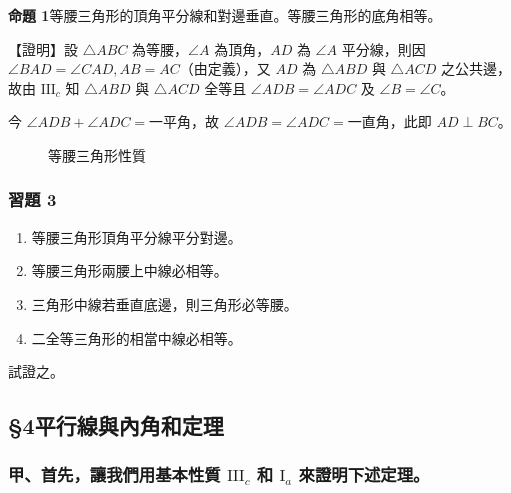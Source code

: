 \noindent\textbf{命題 1}\quad 等腰三角形的頂角平分線和對邊垂直。等腰三角形的底角相等。

\noindent【證明】\quad 設 $\triangle ABC$ 為等腰，$\angle A$ 為頂角，$AD$ 為 $\angle A$ 平分線，則因 $\angle BAD = \angle CAD, AB = AC$（由定義），又 $AD$ 為 $\triangle ABD$ 與 $\triangle ACD$ 之公共邊，故由 $\mathrm{III}_c$ 知 $\triangle ABD$ 與 $\triangle ACD$ 全等且 $\angle ADB = \angle ADC$ 及 $\angle B = \angle C$。

今 $\angle ADB + \angle ADC = \text{一平角}$，故 $\angle ADB = \angle ADC = \text{一直角}$，此即 $AD \perp BC$。

\begin{figure}[H]
\centering
{}
\caption{等腰三角形性質}
\label{fig:b3-a1-17}
\end{figure}

\subsubsection*{習題 3}
\begin{enumerate}[1., leftmargin=2em]
  \item 等腰三角形頂角平分線平分對邊。
  \item 等腰三角形兩腰上中線必相等。
  \item 三角形中線若垂直底邊，則三角形必等腰。
  \item 二全等三角形的相當中線必相等。
\end{enumerate}
試證之。

\subsection*{\S 4\quad 平行線與內角和定理}
\label{sec:b3_a1_4}

\subsubsection*{甲、首先，讓我們用基本性質 $\mathrm{III}_c$ 和 $\mathrm{I}_a$ 來證明下述定理。}

